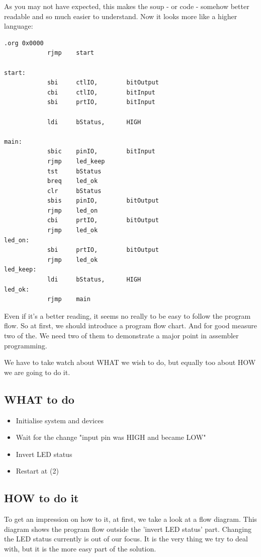 As you may not have expected, this makes the soup - or code - somehow better readable and so much easier to understand. Now it looks more like a higher language:

\begin{lstlisting}
.org 0x0000
            rjmp    start

start:
            sbi     ctlIO,        bitOutput
            cbi     ctlIO,        bitInput
            sbi     prtIO,        bitInput

            ldi     bStatus,      HIGH

main:
            sbic    pinIO,        bitInput
            rjmp    led_keep
            tst     bStatus
            breq    led_ok
            clr     bStatus
            sbis    pinIO,        bitOutput
            rjmp    led_on
            cbi     prtIO,        bitOutput
            rjmp    led_ok
led_on:
            sbi     prtIO,        bitOutput
            rjmp    led_ok
led_keep:
            ldi     bStatus,      HIGH
led_ok:
            rjmp    main
\end{lstlisting}

Even if it's a better reading, it seems no really to be easy to follow the program flow. So at first, we should introduce a program flow chart. And for good measure two of the. We need two of them to demonstrate a major point in assembler programming.

We have to take watch about WHAT we wish to do, but equally too about HOW we are going to do it.

\subsection{WHAT to do}

\begin{itemize}
  \item Initialise system and devices
  \item Wait for the change "input pin was HIGH and became LOW"
  \item Invert LED status
  \item Restart at (2)
\end{itemize}


\subsection{HOW to do it}

To get an impression on how to it, at first, we take a look at a flow diagram. This diagram shows the program flow outside the 'invert LED status' part. Changing the LED status currently is out of our focus. It is the very thing we try to deal with, but it is the more easy part of the solution.

